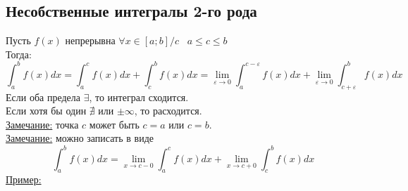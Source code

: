 \documentclass[12pt]{article}
\begin{document}
    \subsection{Несобственные интегралы 2-го рода}
    Пусть $f(x)$ непрерывна $\forall x \in [a;b]/c \;\;\; a \leq c \leq b$\\
    Тогда: 
    \[ \int_{a}^{b}f(x)dx=\int_{a}^{c} f(x)dx+\int_{c}^{b} f(x)dx=\lim_{\varepsilon \to 0}\int_{a}^{c-\varepsilon}f(x)dx+\lim_{\varepsilon \to 0}\int_{c+\varepsilon}^{b}f(x)dx \]
    Если оба предела $\exists$, то интеграл сходится.\\
    Если хотя бы один $\nexists$ или $\pm \infty$, то расходится.\\
    \underline{Замечание:} точка $c$ может быть $c=a$ или $c=b$.\\
    \underline{Замечание:} можно записать в виде 
    \[ \int_{a}^{b}f(x)dx=\lim_{x \to c-0}\int_{a}^{c}f(x)dx+\lim_{x \to c+0} \int_{c}^{b}f(x)dx \]
    \underline{Пример:}\\
\end{document}
